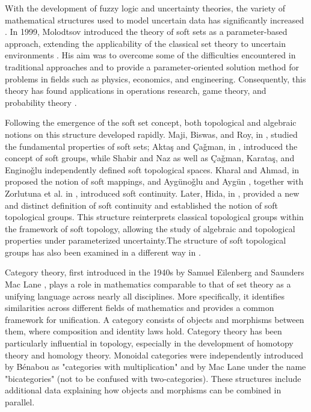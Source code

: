 \documentclass[preprint,12pt]{elsarticle}
\begin{document}
\label{intro}
With the development of fuzzy logic and uncertainty theories, the variety of mathematical structures used to model uncertain data has significantly increased \cite{Zadeh,Pawlak}. In 1999, Molodtsov  introduced the theory of soft sets as a parameter-based approach, extending the applicability of the classical set theory to uncertain environments \cite{Mol}. His aim was to overcome some of the difficulties encountered in traditional approaches and to provide a parameter-oriented solution method for problems in fields such as physics, economics, and engineering. Consequently, this theory has found applications in operations research, game theory, and probability theory \cite{Tripathy}.

Following the emergence of the soft set concept, both topological and algebraic notions on this structure developed rapidly. Maji, Biswas, and Roy, in \cite{Maji}, studied the fundamental properties of soft sets; Akta\c{s} and \c{C}a\v{g}man, in \cite{br1}, introduced the concept of soft groups, while Shabir and Naz \cite{Naz} as well as \c{C}a\v{g}man, Karata\c{s}, and Engino\v{g}lu \cite{Naim} independently defined soft topological spaces. Kharal and Ahmad, in \cite{Kha} proposed the notion of soft mappings, and Ayg\"{u}no\v{g}lu and Ayg\"{u}n \cite{Aygun}, together with Zorlutuna et al. in \cite{Zorlutuna}, introduced soft continuity. Later, Hida, in \cite{Hida}, provided a new and distinct definition of soft continuity and established the notion of soft topological groups. This structure reinterprets classical topological groups within the framework of soft topology, allowing the study of algebraic and topological properties under parameterized uncertainty.The structure of soft topological groups has also been examined in a different way in \cite{Tahat}.

Category theory, first introduced in the 1940s by Samuel Eilenberg \cite{Eilenberg} and Saunders Mac Lane \cite{MacLane}, plays a role in mathematics comparable to that of set theory as a unifying language across nearly all disciplines. More specifically, it identifies similarities across different fields of mathematics and provides a common framework for unification. A category consists of objects and morphisms between them, where composition and identity laws hold. Category theory has been particularly influential in topology, especially in the development of homotopy theory and homology theory. Monoidal categories were independently introduced by B\'{e}nabou \cite{Benabou} as "categories with multiplication" and by Mac Lane \cite{MacLane2} under the name "bicategories" (not to be confused with two-categories). These structures include additional data explaining how objects and morphisms can be combined in parallel.
\end{document}
